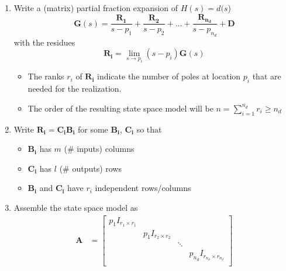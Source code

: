 \begin{enumerate}
    \item Write a (matrix) partial fraction expansion of $H(s)=d(s$)
          \begin{equation*}
              \mathbf{G}(s)=\frac{\mathbf{R_1}}{s-p_1}+\frac{\mathbf{R_2}}{s-p_2}+\ldots+\frac{\mathbf{R_{n_d}}}{s-p_{n_d}}+\mathbf{D}
          \end{equation*} with the residues
          \begin{equation*}
              \mathbf{R_i}=\lim_{s\to p_i}(s-p_i)\mathbf{G}(s)
          \end{equation*}
          \begin{itemize}
              \item The ranks $r_i$ of $\mathbf{R_i}$ indicate the number of poles at location $p_i$ that are needed for the realization.
              \item The order of the resulting state space model will be $n=\sum_{i=1}^{n_d}r_i\geq n_d$
          \end{itemize}
    \item Write $\mathbf{R_i}=\mathbf{C_i B_i}$ for some $\mathbf{B_i}$, $\mathbf{C_i}$ so that
          \begin{itemize}
              \item $\mathbf{B_i}$ has $m$ (\# inputs) columns
              \item $\mathbf{C_i}$ has $l$ (\# outputs) rows
              \item $\mathbf{B_i}$ and $\mathbf{C_i}$ have $r_i$ independent rows/columns
          \end{itemize}
    \item Assemble the state space model as
          \begin{align*}
              \mathbf{A} & =\begin{bmatrix}
                                p_1 I_{r_1\times r_1} &                       &        &                                   \\
                                                      & p_1 I_{r_2\times r_2} &        &                                   \\
                                                      &                       & \ddots &                                   \\
                                                      &                       &        & p_{n_d} I_{r_{n_d}\times r_{n_d}} \\

\end{bmatrix}
\end{align*}
\end{enumerate}
